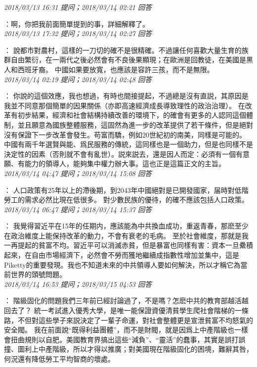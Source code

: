 \documentclass[twocolumn]{ctexart}
\begin{document}
\textit{\hfill\noindent\small 2018/03/13 16:31 提问；2018/03/14 02:21 回答}

：啊，你把我前面簡單提到的事，詳細解釋了。
\\

\textit{\hfill\noindent\small 2018/03/13 17:32 提问；2018/03/14 02:27 回答}

：
說都市對農村，這樣的一刀切的確不是很精確。不過讓任何喜歡大量生育的族群自由繁衍，在一兩代之後必然會有不良後果顯現；在歐洲是回教徒，在美國是黑人和西班牙裔。
中國如果要放寬，也應該是容許三孩，而不是無限。
\\

\textit{\hfill\noindent\small 2018/03/14 02:19 提问；2018/03/14 02:48 回答}

：
你說的這個效應，我也想過，有時也間接提起，不過總是沒有直説，其原因是我並不同意那個簡單的因果關係（亦即高速經濟成長導致理性的政治治理）。
在改革有初步結果，經濟和社會結構持續改善的環境下，的確會有更多的人認同這個體制，並且願意為國族整體服務，這固然為進一步的改革提供了若干條件，但是絕對沒有保證下一步改革會發生。苟富而驕，例如20世紀初的南美，同樣是可能的。
中國有兩千年選賢與能、爲民服務的傳統，這同樣也是一個助力，但是也同樣不是決定性的因素（否則就不會有亂世）。説來説去，還是因人而定：必須有一個有意願、有能力的領導人，能夠集中權力辦大事。這也正是這篇正文的主旨。
\\

\textit{\hfill\noindent\small 2018/03/14 04:47 提问；2018/03/14 15:08 回答}

：
人口政策有25年以上的滯後期，到2043年中國絕對是已開發國家，届時對低階勞工的需求必然比現在低很多。
對少數民族的優待，的確不應該包括人口政策。
\\

\textit{\hfill\noindent\small 2018/03/14 06:47 提问；2018/03/14 15:37 回答}

：
我覺得習近平在15年的任期内，應該能為中共換血成功，重返青春，那麽至少在政治維度上能保持改革的動力，不會有衰老的毛病。
至於社會維度，那就是我一再提起的貧富不均。習近平可以消滅赤貧，但是暴富也同樣有害：資本一旦纍積起來，在自由市場經濟下，必然會不勞而獲地繼續成指數性增加並集中，這是Piketty的重要發現。我也不知道未來的中共領導人要如何解決，所以才稱它為當前世界的頭號問題。
\\

\textit{\hfill\noindent\small 2018/03/14 16:53 提问；2018/03/15 04:53 回答}

：
階級固化的問題我們三年前已經討論過了，不是嗎？怎麽中共的教育部越活越回去了？
統一考試進入優秀大學，是唯一能保證資優清貧學生爬社會階梯的一條路，不但對這些學子來説決定了一輩子命運，對社會整體更是宣泄貧富不均怒氣的安全閥。
我在前面說“既得利益團體”，而不是財閥，就是因爲上中產階級也一樣會扭曲規則以自肥。美國教育界搞出這些“減負”、“靈活”的蠢事，其實是誤打誤撞、圖利上中產階級，所以才得以推廣；對美國現在階級固化的困境，難辭其咎，何況還有降低勞工平均智商的壞處。
\\
\end{document}

